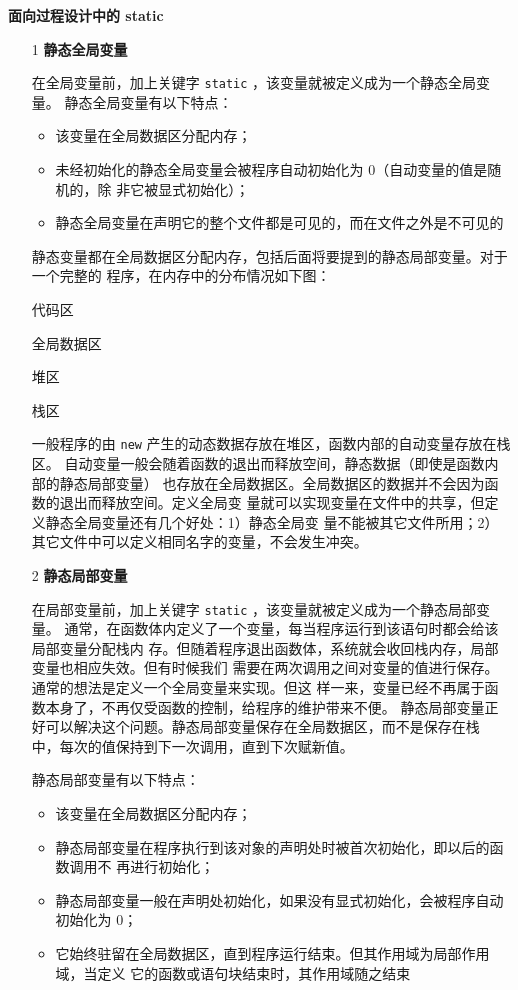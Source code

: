 \noindent\textbf{面向过程设计中的 static}
\begin{itemize}
\item [1] \textbf{静态全局变量}

  在全局变量前，加上关键字 \verb|static| ，该变量就被定义成为一个静态全局变量。
  静态全局变量有以下特点：
  \begin{itemize}
  \item 该变量在全局数据区分配内存；
  \item 未经初始化的静态全局变量会被程序自动初始化为 0（自动变量的值是随机的，除
    非它被显式初始化）；
  \item 静态全局变量在声明它的整个文件都是可见的，而在文件之外是不可见的
  \end{itemize}

  静态变量都在全局数据区分配内存，包括后面将要提到的静态局部变量。对于一个完整的
  程序，在内存中的分布情况如下图：

  \qquad 代码区

  \qquad 全局数据区

  \qquad 堆区

  \qquad 栈区

  一般程序的由 \verb|new| 产生的动态数据存放在堆区，函数内部的自动变量存放在栈区。
  自动变量一般会随着函数的退出而释放空间，静态数据（即使是函数内部的静态局部变量）
  也存放在全局数据区。全局数据区的数据并不会因为函数的退出而释放空间。定义全局变
  量就可以实现变量在文件中的共享，但定义静态全局变量还有几个好处：1）静态全局变
  量不能被其它文件所用；2）其它文件中可以定义相同名字的变量，不会发生冲突。
  
\item [2] \textbf{静态局部变量}

  在局部变量前，加上关键字 \verb|static| ，该变量就被定义成为一个静态局部变量。
  通常，在函数体内定义了一个变量，每当程序运行到该语句时都会给该局部变量分配栈内
  存。但随着程序退出函数体，系统就会收回栈内存，局部变量也相应失效。但有时候我们
  需要在两次调用之间对变量的值进行保存。通常的想法是定义一个全局变量来实现。但这
  样一来，变量已经不再属于函数本身了，不再仅受函数的控制，给程序的维护带来不便。
  静态局部变量正好可以解决这个问题。静态局部变量保存在全局数据区，而不是保存在栈
  中，每次的值保持到下一次调用，直到下次赋新值。

  静态局部变量有以下特点：
  \begin{itemize}
  \item 该变量在全局数据区分配内存；
  \item 静态局部变量在程序执行到该对象的声明处时被首次初始化，即以后的函数调用不
    再进行初始化；
  \item 静态局部变量一般在声明处初始化，如果没有显式初始化，会被程序自动初始化为
    0；
  \item 它始终驻留在全局数据区，直到程序运行结束。但其作用域为局部作用域，当定义
    它的函数或语句块结束时，其作用域随之结束
  \end{itemize}
  

\end{itemize}
